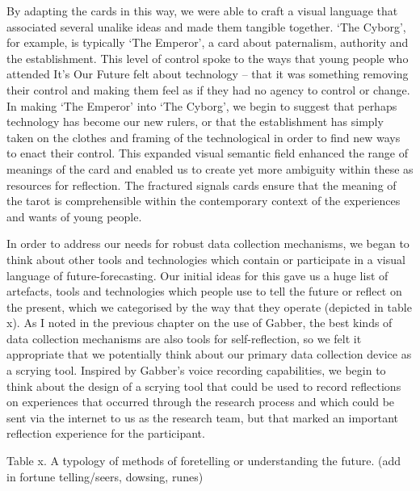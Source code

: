 By adapting the cards in this way, we were able to craft a visual language that associated several unalike ideas and made them tangible together. ‘The Cyborg’, for example, is typically ‘The Emperor’, a card about paternalism, authority and the establishment. This level of control spoke to the ways that young people who attended It’s Our Future felt about technology – that it was something removing their control and making them feel as if they had no agency to control or change. In making ‘The Emperor’ into ‘The Cyborg’, we begin to suggest that perhaps technology has become our new rulers, or that the establishment has simply taken on the clothes and framing of the technological in order to find new ways to enact their control. This expanded visual semantic field enhanced the range of meanings of the card and enabled us to create yet more ambiguity within these as resources for reflection. The fractured signals cards ensure that the meaning of the tarot is comprehensible within the contemporary context of the experiences and wants of young people. 

In order to address our needs for robust data collection mechanisms, we began to think about other tools and technologies which contain or participate in a visual language of future-forecasting. Our initial ideas for this gave us a huge list of artefacts, tools and technologies which people use to tell the future or reflect on the present, which we categorised by the way that they operate (depicted in table x). As I noted in the previous chapter on the use of Gabber, the best kinds of data collection mechanisms are also tools for self-reflection, so we felt it appropriate that we potentially think about our primary data collection device as a scrying tool. Inspired by Gabber’s voice recording capabilities, we begin to think about the design of a scrying tool that could be used to record reflections on experiences that occurred through the research process and which could be sent via the internet to us as the research team, but that marked an important reflection experience for the participant.

Table x. A typology of methods of foretelling or understanding the future. (add in fortune telling/seers, dowsing, runes)

